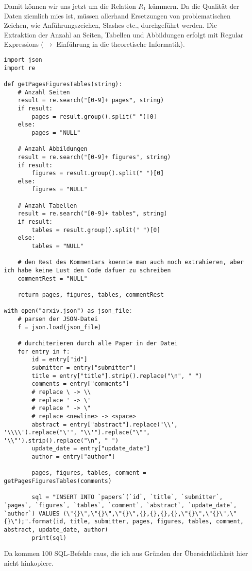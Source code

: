 \documentclass{article}
\begin{document}
	Damit können wir uns jetzt um die Relation $R_1$ kümmern. Da die Qualität der Daten ziemlich mies ist, müssen allerhand Ersetzungen von problematischen Zeichen, wie Anführungszeichen, Slashes etc., durchgeführt werden. Die Extraktion der Anzahl an Seiten, Tabellen und Abbildungen erfolgt mit Regular Expressions ($\to$ Einführung in die theoretische Informatik).
	\begin{lstlisting}[style=python,tabsize=2]
import json
import re

def getPagesFiguresTables(string):
	# Anzahl Seiten
	result = re.search("[0-9]+ pages", string)
	if result:
		pages = result.group().split(" ")[0]
	else:
		pages = "NULL"

	# Anzahl Abbildungen
	result = re.search("[0-9]+ figures", string)
	if result:
		figures = result.group().split(" ")[0]
	else:
		figures = "NULL"

	# Anzahl Tabellen
	result = re.search("[0-9]+ tables", string)
	if result:
		tables = result.group().split(" ")[0]
	else:
		tables = "NULL"

	# den Rest des Kommentars koennte man auch noch extrahieren, aber ich habe keine Lust den Code dafuer zu schreiben
	commentRest = "NULL"

	return pages, figures, tables, commentRest

with open("arxiv.json") as json_file:
	# parsen der JSON-Datei
	f = json.load(json_file)

	# durchiterieren durch alle Paper in der Datei
	for entry in f:
		id = entry["id"]
		submitter = entry["submitter"]
		title = entry["title"].strip().replace("\n", " ")
		comments = entry["comments"]
		# replace \ -> \\
		# replace ' -> \'
		# replace " -> \"
		# replace <newline> -> <space>
		abstract = entry["abstract"].replace('\\', '\\\\').replace("\'", "\\'").replace("\"", '\\"').strip().replace("\n", " ")
		update_date = entry["update_date"]
		author = entry["author"]

		pages, figures, tables, comment = getPagesFiguresTables(comments)

		sql = "INSERT INTO `papers`(`id`, `title`, `submitter`, `pages`, `figures`, `tables`, `comment`, `abstract`, `update_date`, `author`) VALUES (\"{}\",\"{}\",\"{}\",{},{},{},{},\"{}\",\"{}\",\"{}\");".format(id, title, submitter, pages, figures, tables, comment, abstract, update_date, author)
		print(sql)
	\end{lstlisting}
	Da kommen 100 SQL-Befehle raus, die ich aus Gründen der Übersichtlichkeit hier nicht hinkopiere.
	
\end{document}
